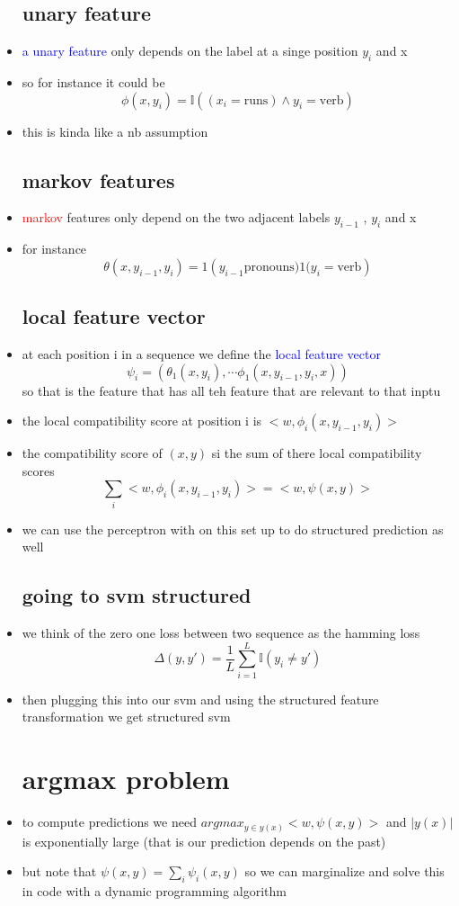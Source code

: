 \documentclass{article}
\begin{document}
\begin{itemize}
\subsection*{unary feature}
\item \textcolor{blue}{a unary feature } only depends on the label at a singe position $y_i$ and x 
\item so for instance it could be $$\phi(x,y_i)=\mathbb{I}((x_i=\text{runs})\land y_i=\text{verb})$$
\item this is kinda like a nb assumption
\subsection*{markov features}
\item \textcolor{red}{markov} features only depend on the two adjacent labels  $y_{i-1}$ , $y_i$ and x 
\item for instance $$\theta(x,y_{i-1}, y_{i})=1(y_{i-1}\text{pronouns)1(}y_i=\text{verb})$$
\subsection*{local feature vector}
\item at each position i in a sequence we define the \textcolor{blue}{local feature vector} $$\psi_{i}=(\theta_1(x,y_i),\cdots \phi_{1}(x,y_{i-1},y_i,x) )$$ so that is the feature that has all teh feature  that are relevant to that inptu  
\item the local compatibility score at position i is $<w,\phi_{i}(x,y_{i-1}, y_i)>$ 
\item the compatibility score of $(x,y)$ si the sum of there local compatibility scores $$\sum_{i}<w,\phi_{i}(x,y_{i-1},y_i)>=<w,\psi(x,y)>$$
\item we can use the perceptron with on this set up to do structured prediction as well
\subsection*{going to svm structured}
\item we think of the zero one loss between two sequence as the hamming loss $$\Delta(y,y')=\frac{1}{L}\sum_{i=1}^{L}\mathbb{I}(y_i\neq y')$$
\item then plugging this into our svm and using the structured feature transformation we get structured svm 
\section*{argmax problem}
\item to compute predictions we need $argmax_{y\in y(x)}<w,\psi(x,y)>$ and $|y(x)|$ is exponentially large (that is our prediction depends on the past)
\item but note that $\psi(x,y)=\sum_{i}\psi_{i}(x,y)$ so we  can marginalize and solve this in code with a dynamic programming algorithm

\end{itemize}
\end{document}
